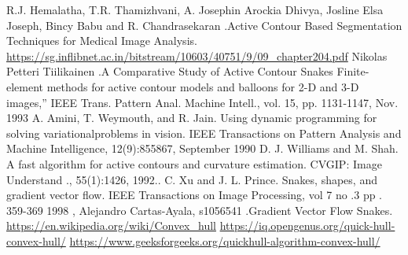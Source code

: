 \documentclass[english,a4,12pt]{report}
\begin{document}
\begin{thebibliography}{99}
         R.J. Hemalatha, T.R. Thamizhvani, A. Josephin Arockia Dhivya, Josline Elsa Joseph, Bincy Babu and R. Chandrasekaran .Active Contour Based Segmentation Techniques for Medical Image Analysis.
         \url{https://sg.inflibnet.ac.in/bitstream/10603/40751/9/09_chapter204.pdf}
         Nikolas Petteri Tiilikainen  .A Comparative Study of Active Contour Snakes
         Finite-element methods for active contour models and balloons for 2-D and 3-D images,” IEEE Trans. Pattern Anal. Machine Intell., vol. 15, pp. 1131-1147, Nov. 1993
         A. Amini, T. Weymouth, and R. Jain. Using dynamic programming for solving variationalproblems in vision. IEEE Transactions on Pattern Analysis and Machine Intelligence, 12(9):855{867, September 1990}
         D. J. Williams and M. Shah. A fast algorithm for active contours and curvature estimation. CVGIP: Image Understand ., 55(1):14{26, 1992..}
         C. Xu and J. L. Prince. Snakes, shapes, and gradient vector flow. IEEE Transactions on Image Processing, vol 7 no .3 pp . 359-369 1998 ,
         Alejandro Cartas-Ayala, s1056541 .Gradient Vector Flow Snakes.
         \url{https://en.wikipedia.org/wiki/Convex_hull}
         \url{https://iq.opengenus.org/quick-hull-convex-hull/}
         \url{https://www.geeksforgeeks.org/quickhull-algorithm-convex-hull/}

    \end{thebibliography}
\end{document}
